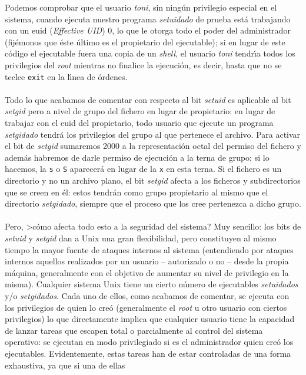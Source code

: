 Podemos comprobar que el usuario {\it toni}, sin ning\'un privilegio
especial en el sistema, cuando ejecuta nuestro programa {\it setuidado} de 
prueba est\'a trabajando con un {\sc euid} ({\it Effective UID}) 0, lo que le
otorga todo el poder del administrador (fij\'emonos que \'este \'ultimo es
el propietario del ejecutable); si en lugar de este c\'odigo el ejecutable
fuera una copia de un {\it shell}, el usuario {\it toni} tendr\'{\i}a todos los
privilegios del {\it root} mientras no finalice la ejecuci\'on, es decir, hasta
que no se teclee {\tt exit} en la l\'{\i}nea de \'ordenes.\\
\\Todo lo que acabamos de comentar con respecto al bit {\it setuid} es aplicable
al bit {\it setgid} pero a nivel de grupo del fichero en lugar de propietario: 
en lugar de trabajar con el {\sc euid} del propietario, todo usuario que 
ejecute un programa {\it setgidado} tendr\'a los privilegios del grupo al que
pertenece el archivo. Para activar el bit de {\it setgid} sumaremos 2000 a la
representaci\'on octal del permiso del fichero y adem\'as habremos de darle
permiso de ejecuci\'on a la terna de grupo; si lo hacemos, la {\tt s} o {\tt S} 
aparecer\'a en lugar de la {\tt x} en esta terna. Si el fichero es un directorio
y no un archivo plano, el bit {\it setgid} afecta a los ficheros y 
subdirectorios que se creen en \'el: estos tendr\'an como grupo propietario al
mismo que el directorio {\it setgidado}, siempre que el proceso que los cree
pertenezca a dicho grupo.\\
\\Pero, >c\'omo afecta todo esto a la seguridad del sistema? Muy sencillo: 
los bits de {\it setuid} y {\it setgid} dan a Unix una gran flexibilidad, pero
constituyen al mismo tiempo la mayor fuente de ataques internos al sistema
(entendiendo por ataques internos aquellos realizados por un usuario --
autorizado o no -- desde la propia m\'aquina, generalmente con el objetivo de
aumentar su nivel de privilegio en la misma).
Cualquier sistema Unix tiene un cierto n\'umero de ejecutables {\it 
setuidados} y/o {\it setgidados}. Cada uno de ellos, como acabamos de comentar,
se ejecuta con los privilegios de quien lo cre\'o (generalmente el {\it root}
u otro usuario con ciertos privilegios) lo que directamente implica que 
cualquier usuario tiene la capacidad de lanzar tareas que escapen total o 
parcialmente al control del sistema operativo: se ejecutan en modo privilegiado
si es el administrador quien cre\'o los ejecutables. Evidentemente, estas 
tareas han de estar controladas de una forma exhaustiva, ya que si una de ellas
